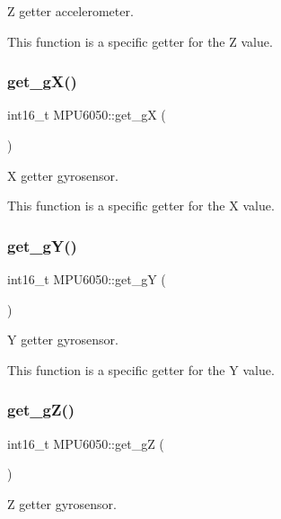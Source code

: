 Z getter accelerometer. 

This function is a specific getter for the Z value. \mbox{\label{classMPU6050_ac932e75f45e2a4f0511f00953d156e65}} 
\subsubsection{\texorpdfstring{get\+\_\+g\+X()}{get\_gX()}}
{\footnotesize\ttfamily int16\+\_\+t M\+P\+U6050\+::get\+\_\+gX (\begin{DoxyParamCaption}{ }\end{DoxyParamCaption})}



X getter gyrosensor. 

This function is a specific getter for the X value. \mbox{\label{classMPU6050_a3df5449f731caca323262c6dd8399909}} 
\subsubsection{\texorpdfstring{get\+\_\+g\+Y()}{get\_gY()}}
{\footnotesize\ttfamily int16\+\_\+t M\+P\+U6050\+::get\+\_\+gY (\begin{DoxyParamCaption}{ }\end{DoxyParamCaption})}



Y getter gyrosensor. 

This function is a specific getter for the Y value. \mbox{\label{classMPU6050_a0d408ead0e95bbb77427040d431cd30a}} 
\subsubsection{\texorpdfstring{get\+\_\+g\+Z()}{get\_gZ()}}
{\footnotesize\ttfamily int16\+\_\+t M\+P\+U6050\+::get\+\_\+gZ (\begin{DoxyParamCaption}{ }\end{DoxyParamCaption})}



Z getter gyrosensor. 

